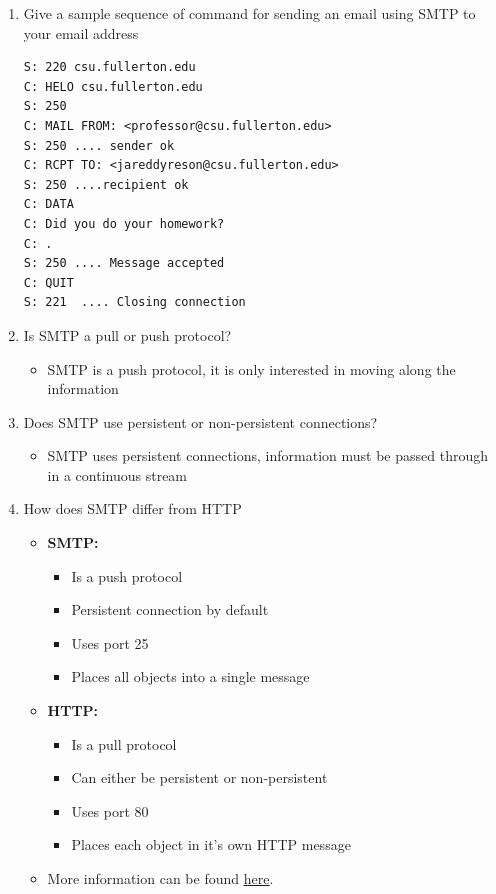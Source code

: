 \documentclass{article}
\begin{document}
\begin{enumerate}
\newpage

\item Give a sample sequence of command for sending an email using SMTP to your email address

\begin{verbatim}
S: 220 csu.fullerton.edu
C: HELO csu.fullerton.edu
S: 250
C: MAIL FROM: <professor@csu.fullerton.edu>
S: 250 .... sender ok
C: RCPT TO: <jareddyreson@csu.fullerton.edu>
S: 250 ....recipient ok
C: DATA
C: Did you do your homework?
C: .
S: 250 .... Message accepted
C: QUIT
S: 221  .... Closing connection
\end{verbatim}

\item Is SMTP a pull or push protocol?

\begin{itemize}
\item SMTP is a push protocol, it is only interested in moving along the information
\end{itemize}

\item Does SMTP use persistent or non-persistent connections?

\begin{itemize}
\item SMTP uses persistent connections, information must be passed through in a continuous stream
\end{itemize}

\item How does SMTP differ from HTTP

\begin{itemize}
\item \textbf{SMTP:}
\begin{itemize}
\item Is a push protocol
\item Persistent connection by default
\item Uses port 25
\item Places all objects into a single message
\end{itemize}
\item \textbf{HTTP:}
\begin{itemize}
\item Is a pull protocol
\item Can either be persistent or non-persistent
\item Uses port 80
\item Places each object in it's own HTTP message
\end{itemize}
\item More information can be found \href{https://www.educative.io/edpresso/smtp-vs-http}{\underline{here}}.
\end{itemize}


\end{enumerate}
\end{document}
